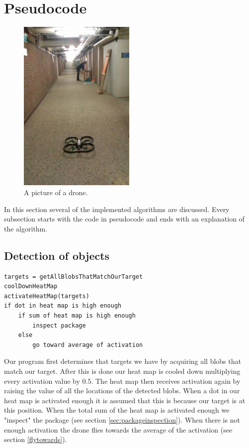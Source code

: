 \documentclass[a4paper,10pt]{article}
\begin{document}
\section{Pseudocode}
\label{sec:pseudocode}
\begin{figure}[h!]
	\caption{A picture of a drone.}
	\centering
	\includegraphics[width=0.5\textwidth]{images/boringHallway}
\end{figure}

In this section several of the implemented algorithms are discussed. Every subsection starts with the code in pseudocode and ends with an explanation of the algorithm. 
\subsection{Detection of objects}
\begin{verbatim}
targets = getAllBlobsThatMatchOurTarget
coolDownHeatMap
activateHeatMap(targets)
if dot in heat map is high enough
    if sum of heat map is high enough
        inspect package
    else
        go toward average of activation
\end{verbatim}
Our program first determines that targets we have by acquiring all blobs that match our target.
After this is done our heat map is cooled down multiplying every activation value by $0.5$. 
The heat map then receives activation again by raising the value of all the locations of the detected blobs. 
When a dot in our heat map is activated enough it is assumed that this is because our target is at this position. 
When the total sum of the heat map is activated enough we "inspect" the package (see section \ref{sec:packageinspection}). 
When there is not enough activation the drone flies towards the average of the activation (see section \ref{flytowards}).
\end{document}
